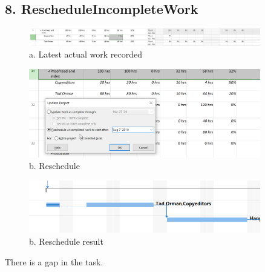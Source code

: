 \documentclass[runningheads]{llncs}
\begin{document}
\subsection*{8. RescheduleIncompleteWork}
\begin{figure}[H]
    \centering
    \includegraphics[width=0.9\textwidth]{./image/t7f1}
    \caption{a. Latest actual work recorded}
\end{figure}
\begin{figure}[H]
    \centering
    \includegraphics[width=0.9\textwidth]{./image/t7f2}
    \caption{b. Reschedule}
\end{figure}
\begin{figure}[H]
    \centering
    \includegraphics[width=0.9\textwidth]{./image/t7f4}
    \caption{b. Reschedule result}
\end{figure}
There is a gap in the task.
\end{document}
